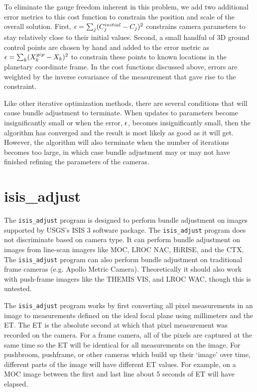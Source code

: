 To eliminate the gauge freedom inherent in this problem, we add two
additional error metrics to this cost function to constrain the position
and scale of the overall solution. First, ${\bf \epsilon} =
\sum_j(C_j^{initial}-C_j)^2$ constrains camera parameters to stay
relatively close to their initial values.  Second, a small handful of
3D ground control points are chosen by hand and added to the
error metric as ${\bf \epsilon} = \sum_k(X_k^{gcp}-X_k)^2$ to
constrain these points to known locations in the planetary coordinate
frame.  In the cost functions discussed above, errors are weighted by
the inverse covariance of the measurement that gave rise to the
constraint.

Like other iterative optimization methods, there are several
conditions that will cause bundle adjustment to terminate.  When
updates to parameters become insignificantly small or when the error,
${\bf \epsilon}$, becomes insignificantly small, then the algorithm
has converged and the result is most likely as good as it will get.
However, the algorithm will also terminate when the number of
iterations becomes too large, in which case bundle adjustment may or
may not have finished refining the parameters of the cameras.

\section{isis\_adjust}

The \texttt{isis\_adjust} program is designed to perform bundle
adjustment on images supported by USGS's \ac{ISIS} 3 software
package.  The \texttt{isis\_adjust} program does not discriminate
based on camera type.  It can perform bundle adjustment on images
from line-scan imagers like \ac{MOC}, \ac{LROC} NAC, \ac{HiRISE},
and the \ac{CTX}.  The \texttt{isis\_adjust} program can also perform
bundle adjustment on traditional frame cameras (e.g. Apollo Metric
Camera).  Theoretically it should also work with push-frame
imagers like the \ac{THEMIS} VIS, and \ac{LROC} WAC, though this is
untested.

The \texttt{isis\_adjust} program works by first converting all
pixel measurements in an image to measurements defined on the ideal
focal plane using millimeters and the \ac{ET}. The \ac{ET} is the
absolute second at which that pixel measurement was recorded on the
camera.  For a frame camera, all of the pixels are captured at the
same time so the \ac{ET} will be identical for all measurements on
the image.  For pushbroom, pushframe, or other cameras which build
up their `image' over time, different parts of the image will have
different ET values.  For example, on a MOC image between the first
and last line about 5 seconds of \ac{ET} will have elapsed.


